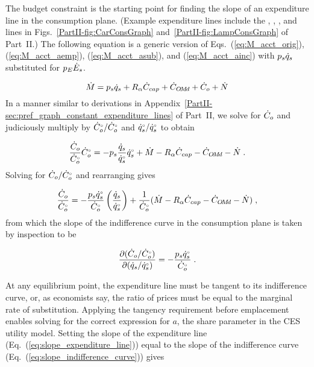 \documentclass[12pt]{article}\usepackage[]{graphicx}\usepackage[]{xcolor}
\begin{document}
The budget constraint is the starting point for finding 
the slope of an expenditure line in the consumption plane.
(Example expenditure lines include
the \circcirc{}, \starstar{}, \hathat{}, and \barbar{} lines
in Figs.~\ref{PartII-fig:CarConsGraph} 
and~\ref{PartII-fig:LampConsGraph} of Part~II.)
The following equation is a generic version of Eqs.~(\ref{eq:M_acct_orig}), 
(\ref{eq:M_acct_aemp}), 
(\ref{eq:M_acct_asub}), and 
(\ref{eq:M_acct_ainc})
with $p_s \dot{q}_s$ substituted for $p_E \dot{E}_s$.

\begin{equation}
  \dot{M} = p_s \dot{q}_s + R_\alpha \dot{C}_{cap} + \dot{C}_{O\!M\!d} + \dot{C}_o  + \dot{N}
\end{equation}
%
In a manner similar to derivations in
Appendix~\ref{PartII-sec:pref_graph_constant_expenditure_lines} of Part~II,
we solve for $\dot{C}_o$ and 
judiciously multiply by ${}{\dot{C}}^{\scriptscriptstyle \circ}_o/{}{\dot{C}}^{\scriptscriptstyle \circ}_o$
and ${}{\dot{q}}^{\scriptscriptstyle \circ}_s/{}{\dot{q}}^{\scriptscriptstyle \circ}_s$ to obtain

\begin{equation}
  \frac{\dot{C}_o}{{}{\dot{C}}^{\scriptscriptstyle \circ}_o} {}{\dot{C}}^{\scriptscriptstyle \circ}_o = - p_s \frac{\dot{q}_s}{{}{\dot{q}}^{\scriptscriptstyle \circ}_s} {}{\dot{q}}^{\scriptscriptstyle \circ}_s
                        + \dot{M} - R_\alpha \dot{C}_{cap} - \dot{C}_{O\!M\!d}  - \dot{N} \; .
\end{equation}
%
Solving for $\dot{C}_o/{}{\dot{C}}^{\scriptscriptstyle \circ}_o$ and rearranging gives

\begin{equation}
  \frac{\dot{C}_o}{{}{\dot{C}}^{\scriptscriptstyle \circ}_o} = - \frac{p_s {}{\dot{q}}^{\scriptscriptstyle \circ}_s}{{}{\dot{C}}^{\scriptscriptstyle \circ}_o}  
                                        \left( \frac{\dot{q}_s}{{}{\dot{q}}^{\scriptscriptstyle \circ}_s}   \right)
                                    + \frac{1}{{}{\dot{C}}^{\scriptscriptstyle \circ}_o}
                                          (\dot{M} - R_\alpha \dot{C}_{cap} - \dot{C}_{O\!M\!d} - \dot{N}) \; ,
\end{equation}
%
from which the slope of the indifference curve in the consumption plane 
is taken by inspection to be

\begin{equation} \label{eq:slope_expenditure_line}
  \frac{\partial (\dot{C}_o/{}{\dot{C}}^{\scriptscriptstyle \circ}_o)}{\partial (\dot{q}_s/{}{\dot{q}}^{\scriptscriptstyle \circ}_s)} =
              - \frac{p_s {}{\dot{q}}^{\scriptscriptstyle \circ}_s}{{}{\dot{C}}^{\scriptscriptstyle \circ}_o} \; .
\end{equation}

At any equilibrium point, the expenditure line must be
tangent to its indifference curve, or, as economists say,
the ratio of prices must be equal to the marginal rate of substitution.
Applying the tangency requirement before emplacement enables 
solving for the correct expression for $a$, the share parameter in the CES utility model.
Setting the slope of the expenditure line (Eq.~(\ref{eq:slope_expenditure_line}))
equal to the slope of the indifference curve (Eq.~(\ref{eq:slope_indifference_curve})) gives
\end{document}
